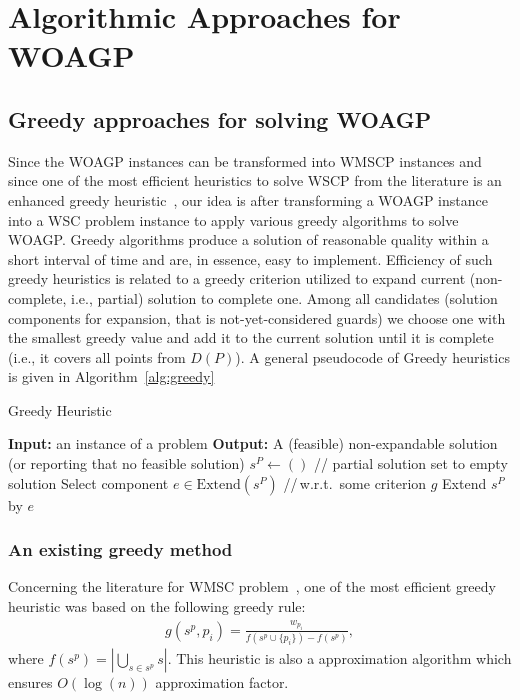 \documentclass[runningheads,a4paper]{elsarticle}
\begin{document}
	\section{Algorithmic Approaches for WOAGP}
	\subsection{Greedy approaches for solving WOAGP}
	Since the WOAGP instances can be transformed into  WMSCP instances and since one of the most efficient heuristics to solve WSCP from the literature is an enhanced greedy heuristic~\cite{chvatal1979greedy}, our idea is after transforming a WOAGP instance into a WSC problem instance to	apply various greedy algorithms to solve WOAGP. Greedy algorithms produce a solution of reasonable quality within a short interval of time and are, in essence, easy to implement. Efficiency of such greedy heuristics is related to a greedy criterion utilized to expand current (non-complete, i.e., partial) solution to complete one. Among all candidates (solution components for expansion, that is not-yet-considered guards) we choose one with the smallest greedy value and add it to the current solution until it is complete (i.e., it covers all  points from $D(P)$).
	A general pseudocode of Greedy heuristics is given in Algorithm~\ref{alg:greedy}
	
	\begin{algorithm}[!t]
		\caption{Greedy Heuristic}\label{alg:greedy}
		\begin{algorithmic}[1]
			\State \textbf{Input:} an instance of a problem
			\State \textbf{Output:} A (feasible) non-expandable solution (or reporting that no feasible solution)
			\State $s^{P} \gets ()$ \hspace{0.3cm}// partial solution set to empty solution
			\State Select component $e \in  \text{Extend}(s^{P})$ \hspace{0.3cm}//\,w.r.t.\  some criterion $g$
			\State Extend $s^{P}$ by $e$
			\EndWhile
		\end{algorithmic}
	\end{algorithm}
	\subsubsection{An existing greedy method}
	
	Concerning the literature for WMSC problem~\cite{chvatal1979greedy, lovasz1975ratio}, one of the most efficient greedy heuristic was based on the following greedy rule:
	\begin{align}
	g(s^p, p_i) = \frac{w_{p_i}}{ f(s^p \cup \{p_i\})  - f(s^p)},
	\end{align}
	where $f(s^p) = |\bigcup_{s \in s^p} s |$.
	This heuristic is also a approximation algorithm which ensures $O(\log(n))$ approximation factor.
	
\end{document}
